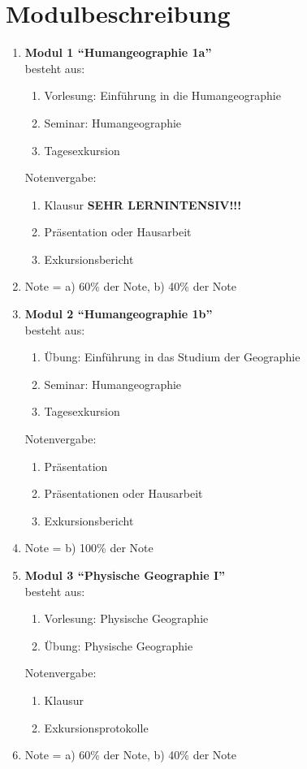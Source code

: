 \section{Modulbeschreibung}
\begin{enumerate}
 \item \textbf{Modul 1 ``Humangeographie 1a''}\\ besteht aus:
  \begin{enumerate}
   \item Vorlesung: Einführung in die Humangeographie
   \item Seminar: Humangeographie
   \item Tagesexkursion
  \end{enumerate}
  Notenvergabe:
  \begin{enumerate}
   \item Klausur \textbf{SEHR LERNINTENSIV!!!}
   \item Präsentation oder Hausarbeit
   \item Exkursionsbericht
  \end{enumerate}    %
  \item[] Note = a) 60\% der Note, b) 40\% der Note

 \item \textbf{Modul 2 ``Humangeographie 1b''} \\ besteht aus:
  \begin{enumerate}
   \item Übung: Einführung in das Studium der Geographie
   \item Seminar: Humangeographie
   \item Tagesexkursion
  \end{enumerate}
  Notenvergabe:
  \begin{enumerate}
   \item Präsentation
   \item Präsentationen oder Hausarbeit
   \item Exkursionsbericht
  \end{enumerate}
  \item[] Note = b) 100\% der Note

 \item \textbf{Modul 3 ``Physische Geographie I''}  \\ besteht aus:
  \begin{enumerate}
   \item Vorlesung: Physische Geographie
   \item Übung: Physische Geographie
  \end{enumerate}
  Notenvergabe:
  \begin{enumerate}
   \item Klausur
   \item Exkursionsprotokolle
  \end{enumerate}
  \item[] Note = a) 60\% der Note, b) 40\% der Note


\end{enumerate}
